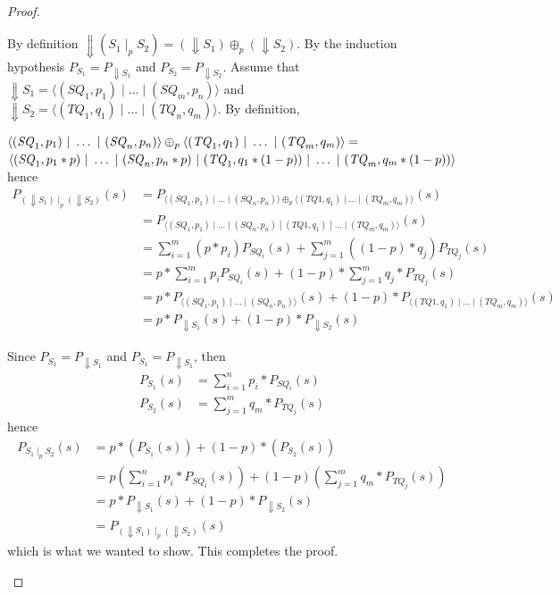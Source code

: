 \documentclass[acmsmall,screen,anonymous]{acmart}
\begin{document}
\begin{proof}
\begin{enumerate}
By definition $\Downarrow (S_1 \; |_p \; S_2) = (\Downarrow S_1) \oplus_p (\Downarrow S_2)$. By the induction hypothesis $P_{S_1} = P_{\Downarrow S_1}$ and $P_{S_2} = P_{\Downarrow S_2}$. Assume that $\Downarrow S_1 = \langle (SQ_1,p_1) \; | \; \ldots \; | \; (SQ_m, p_n)\rangle$ and $\Downarrow S_2 = \langle (TQ_1,q_1) \; | \; \ldots \; | \; (TQ_n, q_m) \rangle$. By definition, 

  $\langle(\mathit{SQ}_1,p_1)~|~\ldots~|~(\mathit{SQ}_n,p_n)\rangle\oplus_{p}\langle(\mathit{TQ}_1,q_1)~|~\ldots~|~(\mathit{TQ}_m,q_m)\rangle =$\\
  $\langle(\mathit{SQ}_1,p_1*p)~|~\ldots~|~(\mathit{SQ}_n,p_n*p)~|~(\mathit{TQ}_1,q_1*(1-p))~|~\ldots~|~(\mathit{TQ}_m,q_m*(1-p))\rangle$
  hence
  \begin{align*}
  P_{(\Downarrow S_1) \; |_p \; (\Downarrow S_2)}(s) &= P_{\langle (SQ_1,p_1) \; | \; \ldots \; | \; (SQ_n, p_n)\rangle \oplus_p \langle (TQ1, q_1) \; | \; \ldots \; | \; (TQ_m, q_m)\rangle}(s) \\
  &= P_{\langle (SQ_1,p_1) \; | \; \ldots \; | \; (SQ_n, p_n) \; | \; (TQ1, q_1) \; | \; \ldots \; | \; (TQ_m, q_m)\rangle}(s)\\
  &= \sum_{i=1}^m (p * p_i) P_{SQ_i}(s) + \sum_{j=1}^m ((1-p) * q_j) P_{TQ_j}(s)\\
  &= p * \sum_{i=1}^m p_i P_{SQ_i}(s) + (1-p)* \sum_{j=1}^m q_j * P_{TQ_j}(s)\\
&= p * P_{\langle (SQ_1,p_1) \; | \; \ldots \; | \; (SQ_n, p_n)\rangle}(s) + (1-p) * P_{\langle (TQ1, q_1) \; | \; \ldots \; | \; (TQ_m, q_m)\rangle}(s)\\
&= p * P_{\Downarrow S_1}(s) + (1-p) * P_{\Downarrow S_2}(s) 
  \end{align*}
  
  Since $P_{S_1} = P_{\Downarrow S_1}$ and $P_{S_1} = P_{\Downarrow S_1}$, then 
  \begin{align*}
  P_{S_1}(s) &= \sum_{i=1}^n p_i * P_{SQ_i}(s)\\
  P_{S_2}(s) &= \sum_{j=1}^m q_m * P_{TQ_j}(s)
  \end{align*}
  hence
  \begin{align*}
  P_{S_1 \; |_p \; S_2}(s) &= p * (P_{S_1}(s)) + (1-p) * (P_{S_2}(s))\\
  &= p \left(\sum_{i=1}^n p_i * P_{SQ_i}(s)\right) + (1-p)\left(\sum_{j=1}^m q_m * P_{TQ_j}(s)\right)\\
  &= p * P_{\Downarrow S_1}(s) + (1-p) * P_{\Downarrow S_2}(s)\\
  &= P_{(\Downarrow S_1) \; |_p \; (\Downarrow S_2)}(s)
  \end{align*}
  which is what we wanted to show. This completes the proof.
\end{enumerate}
\end{proof}
\end{document}
